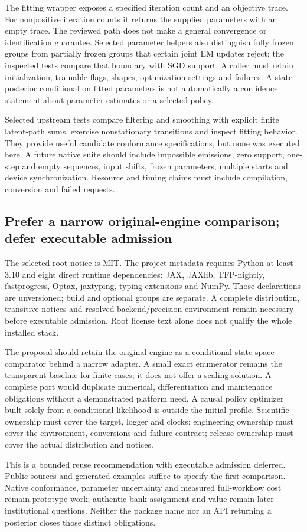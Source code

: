 The fitting wrapper exposes a specified iteration count and an objective trace.
For nonpositive iteration counts it returns the supplied parameters with an
empty trace. The reviewed path does not make a general convergence or
identification guarantee. Selected parameter helpers also distinguish fully
frozen groups from partially frozen groups that certain joint EM updates
reject; the inspected tests compare that boundary with SGD support. A caller
must retain initialization, trainable flags, shapes, optimization settings and
failures. A state posterior conditional on fitted parameters is not automatically
a confidence statement about parameter estimates or a selected policy.
\citep{exec19_dynamax_source}

Selected upstream tests compare filtering and smoothing with explicit finite
latent-path sums, exercise nonstationary transitions and inspect fitting
behavior. They provide useful candidate conformance specifications, but none
was executed here. A future native suite should include impossible emissions,
zero support, one-step and empty sequences, input shifts, frozen parameters,
multiple starts and device synchronization. Resource and timing claims must
include compilation, conversion and failed requests.\citep{exec19_dynamax_source}

\subsection{Prefer a narrow original-engine comparison; defer executable admission}
\label{exec19:dynamax-choice}

The selected root notice is MIT. The project metadata requires Python at least
3.10 and eight direct runtime dependencies: JAX, JAXlib, TFP-nightly,
fastprogress, Optax, jaxtyping, typing-extensions and NumPy. Those declarations
are unversioned; build and optional groups are separate. A complete distribution,
transitive notices and resolved backend/precision environment remain necessary
before executable admission. Root license text alone does not qualify the whole
installed stack.\citep{exec19_dynamax_source}

The proposal should retain the original engine as a conditional-state-space
comparator behind a narrow adapter. A small exact enumerator remains the
transparent baseline for finite cases; it does not offer a scaling solution.
A complete port would duplicate numerical, differentiation and maintenance
obligations without a demonstrated platform need. A causal policy optimizer
built solely from a conditional likelihood is outside the initial profile.
Scientific ownership must cover the target, logger and clocks; engineering
ownership must cover the environment, conversions and failure contract; release
ownership must cover the actual distribution and notices.

This is a bounded reuse recommendation with executable admission deferred.
Public sources and generated examples suffice to specify the first comparison.
Native conformance, parameter uncertainty and measured full-workflow cost remain
prototype work; authentic bank assignment and value remain later institutional
questions. Neither the package name nor an API returning a posterior closes
those distinct obligations.
